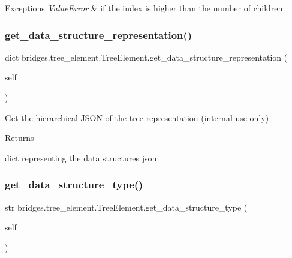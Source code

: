 \begin{DoxyExceptions}{Exceptions}
{\em Value\+Error} & if the index is higher than the number of children \\
\hline
\end{DoxyExceptions}
\mbox{\label{classbridges_1_1tree__element_1_1_tree_element_a498e573b1a711204162d348f315eaeee}} 
\subsubsection{\texorpdfstring{get\_data\_structure\_representation()}{get\_data\_structure\_representation()}}
{\footnotesize\ttfamily  dict bridges.\+tree\+\_\+element.\+Tree\+Element.\+get\+\_\+data\+\_\+structure\+\_\+representation (\begin{DoxyParamCaption}\item[{}]{self }\end{DoxyParamCaption})}



Get the hierarchical J\+S\+ON of the tree representation (internal use only) 

\begin{DoxyReturn}{Returns}


dict representing the data structures json 
\end{DoxyReturn}
\mbox{\label{classbridges_1_1tree__element_1_1_tree_element_a54a14bd74fe1f86dd73f90c57f88c10b}} 
\subsubsection{\texorpdfstring{get\_data\_structure\_type()}{get\_data\_structure\_type()}}
{\footnotesize\ttfamily  str bridges.\+tree\+\_\+element.\+Tree\+Element.\+get\+\_\+data\+\_\+structure\+\_\+type (\begin{DoxyParamCaption}\item[{}]{self }\end{DoxyParamCaption})}



